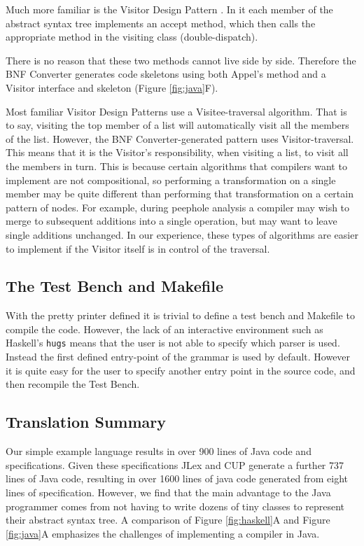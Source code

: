 \documentclass{llncs}
\begin{document}
Much more familiar is the Visitor Design Pattern \cite{visitor}. In it each member of the abstract syntax tree implements an accept method, which then calls the appropriate method in the visiting class (double-dispatch).

There is no reason that these two methods cannot live side by side. Therefore the BNF Converter generates code skeletons using both Appel's method and a Visitor interface and skeleton (Figure \ref{fig:java}F).

Most familiar Visitor Design Patterns use a Visitee-traversal algorithm. That is to say, visiting the top member of a list will automatically visit all the members of the list. However, the BNF Converter-generated pattern uses Visitor-traversal. This means that it is the Visitor's responsibility, when visiting a list, to visit all the members in turn. This is because certain algorithms that compilers want to implement are not compositional, so performing a transformation on a single member may be quite different than performing that transformation on a certain pattern of nodes. For example, during peephole analysis a compiler may wish to merge to subsequent additions into a single operation, but may want to leave single additions unchanged. In our experience, these types of algorithms are easier to implement if the Visitor itself is in control of the traversal.

\subsection{The Test Bench and Makefile}

With the pretty printer defined it is trivial to define a test bench and Makefile to compile the code. However, the lack of an interactive environment such as Haskell's \texttt{hugs} means that the user is not able to specify which parser is used. Instead the first defined entry-point of the grammar is used by default. However it is quite easy for the user to specify another entry point in the source code, and then recompile the Test Bench.

\subsection{Translation Summary}

Our simple example language results in over 900 lines of Java code and specifications. Given these specifications JLex and CUP generate a further 737 lines of Java code, resulting in over 1600 lines of java code generated from eight lines of specification. However, we find that the main advantage to the Java programmer comes from not having to write dozens of tiny classes to represent their abstract syntax tree. A comparison of Figure \ref{fig:haskell}A and Figure \ref{fig:java}A emphasizes the challenges of implementing a compiler in Java.
\end{document}
